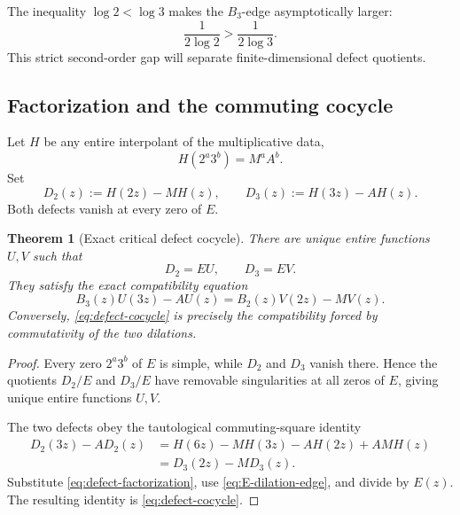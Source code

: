\documentclass[11pt,oneside]{article}
\newtheorem{theorem}{Theorem}[section]
\theoremstyle{definition}
\theoremstyle{remark}
\begin{document}
The inequality \(\log2<\log3\) makes the \(B_3\)-edge asymptotically larger:
\begin{equation}
  \frac1{2\log2}>\frac1{2\log3}.
  \label{eq:edge-gap}
\end{equation}
This strict second-order gap will separate finite-dimensional defect quotients.

\subsection{Factorization and the commuting cocycle}

Let \(H\) be any entire interpolant of the multiplicative data,
\[
  H(2^a3^b)=M^aA^b.
\]
Set
\begin{equation}
  D_2(z):=H(2z)-MH(z),
  \qquad
  D_3(z):=H(3z)-AH(z).
  \label{eq:two-defects}
\end{equation}
Both defects vanish at every zero of \(E\).

\begin{theorem}[Exact critical defect cocycle]
\label{thm:defect-cocycle}
There are unique entire functions \(U,V\) such that
\begin{equation}
  D_2=EU,
  \qquad
  D_3=EV.
  \label{eq:defect-factorization}
\end{equation}
They satisfy the exact compatibility equation
\begin{equation}
  B_3(z)U(3z)-A U(z)
  =B_2(z)V(2z)-M V(z).
  \label{eq:defect-cocycle}
\end{equation}
Conversely, \eqref{eq:defect-cocycle} is precisely the compatibility forced by commutativity of the two dilations.
\end{theorem}

\begin{proof}
Every zero \(2^a3^b\) of \(E\) is simple, while \(D_2\) and \(D_3\) vanish there.  Hence the quotients \(D_2/E\) and \(D_3/E\) have removable singularities at all zeros of \(E\), giving unique entire functions \(U,V\).

The two defects obey the tautological commuting-square identity
\begin{align*}
  D_2(3z)-A D_2(z)
  &=H(6z)-M H(3z)-A H(2z)+AMH(z)\\
  &=D_3(2z)-M D_3(z).
\end{align*}
Substitute \eqref{eq:defect-factorization}, use \eqref{eq:E-dilation-edge}, and divide by \(E(z)\).  The resulting identity is \eqref{eq:defect-cocycle}.
\end{proof}
\end{document}

